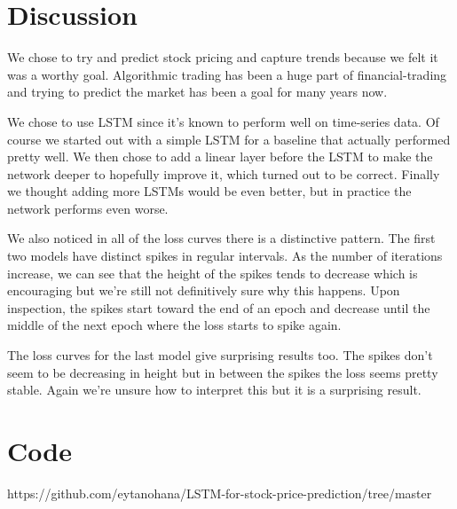 \documentclass{article}
\begin{document}
\section{Discussion}

We chose to try and predict stock pricing and capture trends because we felt it was a worthy goal. Algorithmic trading has been a huge part of financial-trading and trying to predict the market has been a goal for many years now. 

We chose to use LSTM since it's known to perform well on time-series data. Of course we started out with a simple LSTM for a baseline that actually performed pretty well. We then chose to add a linear layer before the LSTM to make the network deeper to hopefully improve it, which turned out to be correct. Finally we thought adding more LSTMs would be even better, but in practice the network performs even worse. 

We also noticed in all of the loss curves there is a distinctive pattern. The first two models have distinct spikes in regular intervals. As the number of iterations increase, we can see that the height of the spikes tends to decrease which is encouraging but we're still not definitively sure why this happens. Upon inspection, the spikes start toward the end of an epoch and decrease until the middle of the next epoch where the loss starts to spike again.

The loss curves for the last model give surprising results too. The spikes don't seem to be decreasing in height but in between the spikes the loss seems pretty stable. Again we're unsure how to interpret this but it is a surprising result. 




\section{Code}

https://github.com/eytanohana/LSTM-for-stock-price-prediction/tree/master

%
%
\end{document}
